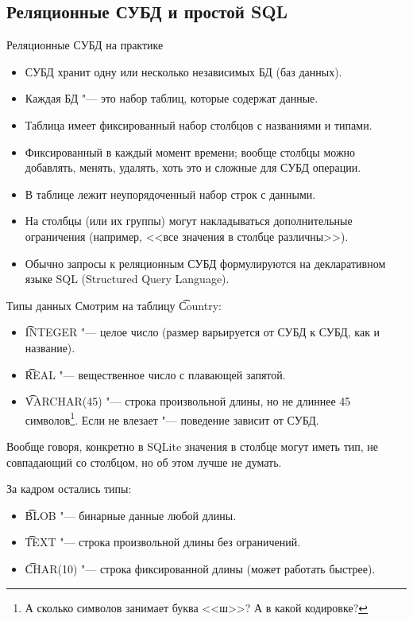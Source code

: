 \subsection{Реляционные СУБД и простой SQL}

\begin{frame}{Реляционные СУБД на практике}
	\begin{itemize}
		\item СУБД хранит одну или несколько независимых БД (баз данных).
		\item Каждая БД "--- это набор таблиц, которые содержат данные.
		\item Таблица имеет фиксированный набор столбцов с названиями и типами.
		\item Фиксированный в каждый момент времени; вообще столбцы можно добавлять, менять, удалять, хоть это и сложные для СУБД операции.
		\item В таблице лежит неупорядоченный набор строк с данными.
		\item На столбцы (или их группы) могут накладываться дополнительные ограничения (например, <<все значения в столбце различны>>).
		\item Обычно запросы к реляционным СУБД формулируются на декларативном языке SQL
			(Structured Query Language).
	\end{itemize}
\end{frame}

\begin{frame}{Типы данных}
	Смотрим на таблицу \t{Country}:
	\begin{itemize}
		\item \t{INTEGER} "--- целое число (размер варьируется от СУБД к СУБД, как и название).
		\item \t{REAL} "--- вещественное число с плавающей запятой.
		\item \t{VARCHAR(45)} "--- строка произвольной длины, но не длиннее 45 символов\footnote{А сколько символов занимает буква <<ш>>? А в какой кодировке?}.
			Если не влезает "--- поведение зависит от СУБД.
	\end{itemize}
	Вообще говоря, конкретно в SQLite значения в столбце могут иметь тип, не совпадающий со столбцом, но об этом лучше не думать.

	За кадром остались типы:
	\begin{itemize}
		\item \t{BLOB} "--- бинарные данные любой длины.
		\item \t{TEXT} "--- строка произвольной длины без ограничений.
		\item \t{CHAR(10)} "--- строка фиксированной длины (может работать быстрее).
	\end{itemize}
\end{frame}

